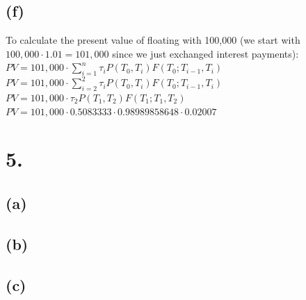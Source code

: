 \documentclass{article}
\begin{document}
{\subsection*{(f)}

To calculate the present value of floating with 100,000 (we start with $100,000 \cdot 1.01 = 101,000$ since we just exchanged interest payments): \\
$PV = 101,000 \cdot \sum_{i=1}^{n} \tau_i P(T_0, T_i) F(T_0; T_{i-1}, T_i)$ \\
$PV = 101,000 \cdot \sum_{i=2}^{2} \tau_i P(T_0, T_i) F(T_0; T_{i-1}, T_i)$ \\
$PV = 101,000 \cdot \tau_2 P(T_1, T_2) F(T_1; T_1, T_2)$ \\
$PV = 101,000 \cdot 0.5083333 \cdot 0.98989858648 \cdot 0.02007$ \\

}

\section*{5.}
{\Large 

\subsection*{(a)}

\subsection*{(b)}

\subsection*{(c)}

}
\end{document}
